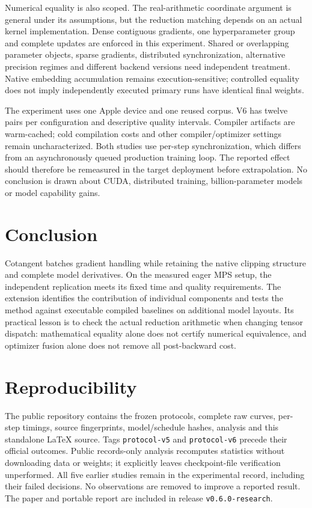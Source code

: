 \documentclass[11pt]{article}
\newcommand{\code}[1]{\texttt{#1}}
\begin{document}
Numerical equality is also scoped. The real-arithmetic coordinate argument is
general under its assumptions, but the reduction matching depends on an actual
kernel implementation. Dense contiguous gradients, one hyperparameter group
and complete updates are enforced in this experiment. Shared or overlapping
parameter objects, sparse gradients, distributed synchronization, alternative
precision regimes and different backend versions need independent treatment.
Native embedding accumulation remains execution-sensitive; controlled equality
does not imply independently executed primary runs have identical final weights.

The experiment uses one Apple device and one reused corpus. V6 has twelve
pairs per configuration and descriptive quality intervals. Compiler artifacts
are warm-cached; cold compilation costs and other compiler/optimizer settings
remain uncharacterized. Both studies use per-step synchronization, which differs
from an asynchronously queued production training loop. The reported effect
should therefore be remeasured in the target deployment before extrapolation.
No conclusion is drawn about CUDA, distributed training, billion-parameter
models or model capability gains.

\section{Conclusion}
Cotangent batches gradient handling while retaining the native clipping
structure and complete model derivatives. On the measured eager MPS setup,
the independent replication meets its fixed time and quality requirements.
The extension identifies the contribution of individual components and tests
the method against executable compiled baselines on additional model layouts.
Its practical lesson is to check the actual reduction arithmetic when changing
tensor dispatch: mathematical equality alone does not certify numerical
equivalence, and optimizer fusion alone does not remove all post-backward cost.

\section*{Reproducibility}
The public repository contains the frozen protocols, complete raw curves,
per-step timings, source fingerprints, model/schedule hashes, analysis and this
standalone LaTeX source. Tags \code{protocol-v5} and \code{protocol-v6}
precede their official outcomes. Public records-only analysis recomputes
statistics without downloading data or weights; it explicitly leaves
checkpoint-file verification unperformed. All five earlier studies remain in
the experimental record, including their failed decisions. No observations are
removed to improve a reported result. The paper and portable report are included in release \code{v0.6.0-research}.
\end{document}
